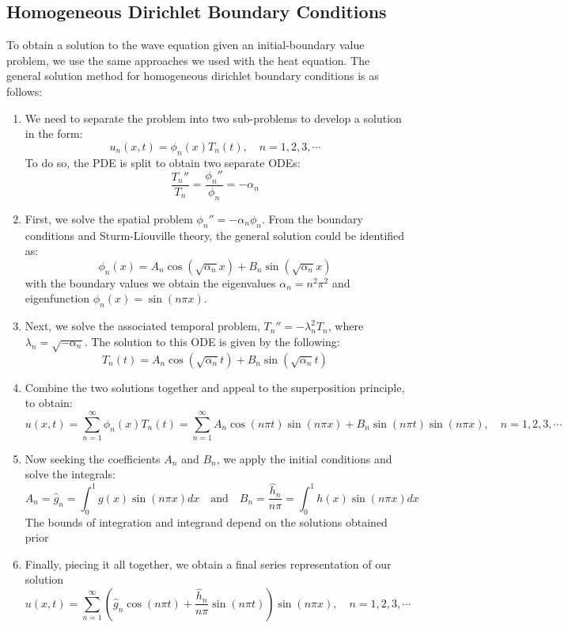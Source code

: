 \documentclass[11pt]{article}
\begin{document}
\subsection{Homogeneous Dirichlet Boundary Conditions}
To obtain a solution to the wave equation given an initial-boundary value problem, we use the same approaches we used with the heat equation. The general solution method for homogeneous dirichlet boundary conditions is as follows: 
\begin{enumerate}
\item We need to separate the problem into two sub-problems to develop a solution in the form: 
$$ u_n(x,t) = \phi_n(x) T_n(t), \quad n=1,2,3, \cdots$$
To do so, the PDE is split to obtain two separate ODEs:
$$ \frac{T_n''}{T_n} = \frac{\phi_n''}{\phi_n} = -\alpha_n$$
\item First, we solve the spatial problem $\phi_n'' = -\alpha_n \phi_n$.  From the boundary conditions and Sturm-Liouville theory, the general solution could be identified as:
$$ \phi_n(x) = A_n \cos ( \sqrt{\alpha_n} x) + B_n \sin ( \sqrt{\alpha_n} x)$$
with the boundary values we obtain the eigenvalues $\alpha_n = n^2 \pi ^2$ and eigenfunction $\phi_n(x) = \sin(n \pi x) $.
\item Next, we solve the associated temporal problem, $T_n'' = -\lambda_n^2 T_n$, where $\lambda_n = \sqrt{-\alpha_n}$. The solution to this ODE is given by the following: 
$$ T_n(t) = A_n \cos ( \sqrt{\alpha_n} t) + B_n \sin ( \sqrt{\alpha_n} t)$$
\item Combine the two solutions together and appeal to the superposition principle, to obtain:
$$u(x,t) =   \sum_{n=1}^{\infty}  \phi_n(x) T_n(t) = \sum_{n=1}^{\infty} A_n \cos (n \pi t) \sin (n \pi x) + B_n \sin (n \pi t) \sin(n \pi x), \quad n=1,2,3, \cdots$$
\item Now seeking the coefficients $A_n$ and $B_n$, we apply the initial conditions and solve the integrals:
$$ A_n = \hat{g}_n = \int_0^1 g(x) \sin(n \pi x)dx \quad \text{and} \quad B_n = \frac{\hat{h}_n}{n\pi} = \int_0^1 h(x) \sin(n \pi x)dx $$
The bounds of integration and integrand depend on the solutions obtained prior
\item Finally, piecing it all together, we obtain a final series representation of our solution
$$u(x,t) =  \sum_{n=1}^{\infty} \left( \hat{g}_n \cos(n \pi t) + \frac{\hat{h}_n}{n \pi} \sin (n \pi t) \right)\sin(n\pi x), \quad n=1,2,3, \cdots$$
\end{enumerate}
\end{document}
